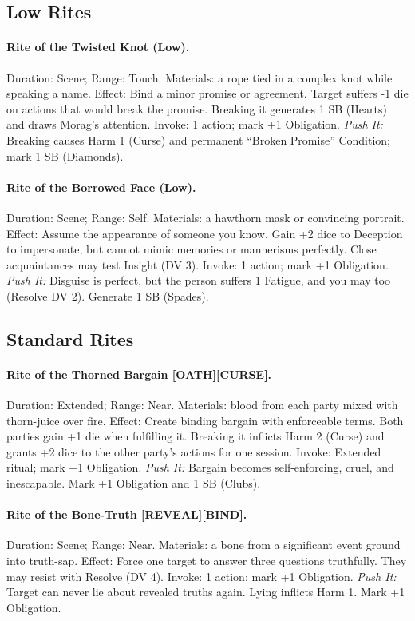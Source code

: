 \documentclass[11pt]{article}
\begin{document}
\subsection*{Low Rites}
\paragraph{Rite of the Twisted Knot (Low).} Duration: Scene; Range: Touch.  
Materials: a rope tied in a complex knot while speaking a name.  
Effect: Bind a minor promise or agreement. Target suffers -1 die on actions that would break the promise. Breaking it generates 1 SB (Hearts) and draws Morag's attention.  
Invoke: 1 action; mark +1 Obligation.  
\emph{Push It:} Breaking causes Harm 1 (Curse) and permanent ``Broken Promise'' Condition; mark 1 SB (Diamonds).  

\paragraph{Rite of the Borrowed Face (Low).} Duration: Scene; Range: Self.  
Materials: a hawthorn mask or convincing portrait.  
Effect: Assume the appearance of someone you know. Gain +2 dice to Deception to impersonate, but cannot mimic memories or mannerisms perfectly. Close acquaintances may test Insight (DV 3).  
Invoke: 1 action; mark +1 Obligation.  
\emph{Push It:} Disguise is perfect, but the person suffers 1 Fatigue, and you may too (Resolve DV 2). Generate 1 SB (Spades).

\subsection*{Standard Rites}
\paragraph{Rite of the Thorned Bargain [OATH][CURSE].} Duration: Extended; Range: Near.  
Materials: blood from each party mixed with thorn-juice over fire.  
Effect: Create binding bargain with enforceable terms. Both parties gain +1 die when fulfilling it. Breaking it inflicts Harm 2 (Curse) and grants +2 dice to the other party's actions for one session.  
Invoke: Extended ritual; mark +1 Obligation.  
\emph{Push It:} Bargain becomes self-enforcing, cruel, and inescapable. Mark +1 Obligation and 1 SB (Clubs).  

\paragraph{Rite of the Bone-Truth [REVEAL][BIND].} Duration: Scene; Range: Near.  
Materials: a bone from a significant event ground into truth-sap.  
Effect: Force one target to answer three questions truthfully. They may resist with Resolve (DV 4).  
Invoke: 1 action; mark +1 Obligation.  
\emph{Push It:} Target can never lie about revealed truths again. Lying inflicts Harm 1. Mark +1 Obligation.
\end{document}
